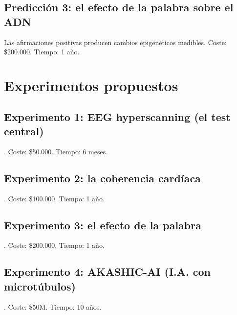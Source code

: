 \subsection{Predicción 3: el efecto de la palabra sobre el ADN}
Las afirmaciones positivas producen cambios epigenéticos medibles. Coste: \$200.000. Tiempo: 1 año.

\section{Experimentos propuestos}
\subsection{Experimento 1: EEG hyperscanning (el test central)}. Coste: \$50.000. Tiempo: 6 meses.
\subsection{Experimento 2: la coherencia cardíaca}. Coste: \$100.000. Tiempo: 1 año.
\subsection{Experimento 3: el efecto de la palabra}. Coste: \$200.000. Tiempo: 1 año.
\subsection{Experimento 4: AKASHIC-AI (I.A. con microtúbulos)}. Coste: \$50M. Tiempo: 10 años.

